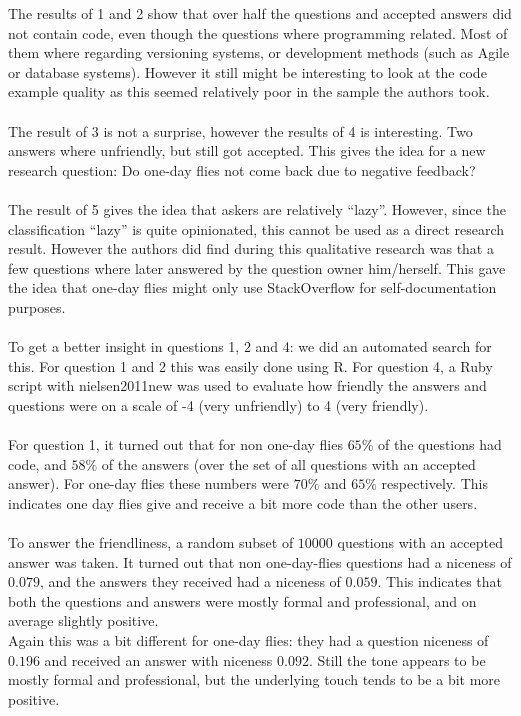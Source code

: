 \documentclass[conference]{IEEEtran}
\begin{document}
The results of 1 and 2 show that over half the questions and accepted answers did not contain code, even though the questions where programming related. Most of them where regarding versioning systems, or development methods (such as Agile or database systems).  However it still might be interesting to look at the code example quality as this seemed relatively poor in the sample the authors took.
\\
\\
The result of 3 is not a surprise, however the results of 4 is interesting. Two answers where unfriendly, but still got accepted. This gives the idea for a new research question: Do one-day flies  not come back due to negative feedback? 
\\
\\
The result of 5  gives the idea that askers are relatively ``lazy''. However, since the classification ``lazy'' is quite opinionated, this cannot be used as a direct research result. However the authors did find during this qualitative research was that a few questions where later answered by the question owner him/herself. This gave the idea that one-day flies might only use StackOverflow for self-documentation purposes. 
\\
\\
To get a better insight in questions 1, 2 and 4: we did an automated search for this. For question 1 and 2 this was easily done using R. For question 4, a Ruby script with nielsen2011new \cite{nielsen2011new} was used to evaluate how friendly the answers and questions were on a scale of -4 (very unfriendly) to 4 (very friendly). 
\\
\\
For question 1, it turned out that for non one-day flies $65\%$ of the questions had code, and $58\%$ of the answers (over the set of all questions with an accepted answer). For one-day flies these numbers were $70\%$ and $65\%$ respectively. This indicates one day flies give and receive a bit more code than the other users.
\\
\\
To answer the friendliness, a random subset of $10000$ questions with an accepted answer was taken. It turned out that non one-day-flies questions had a niceness of $0.079$, and the answers they received had a niceness of $0.059$. This indicates that both the questions and answers were mostly formal and professional, and on average slightly positive.
\\
Again this was a bit different for one-day flies: they had a question niceness of $0.196$ and received an answer with niceness $0.092$. Still the tone appears to be mostly formal and professional, but the underlying touch tends to be a bit more positive.
\end{document}
